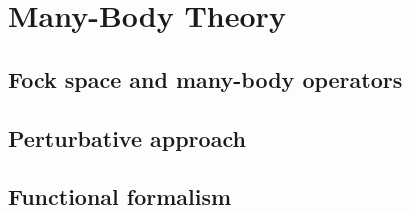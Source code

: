 \documentclass[../QFT_main.tex]{subfiles}
\begin{document}
\chapter{Many-Body Theory}\label{ch:many_body_theory}


\section{Fock space and many-body operators}


\section{Perturbative approach}

\section{Functional formalism}
\end{document}
